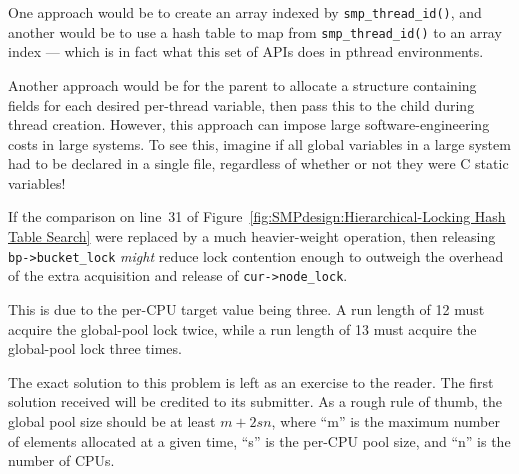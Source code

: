 
	One approach would be to create an array indexed by
	{\tt smp\_thread\_id()}, and another would be to use a hash
	table to map from {\tt smp\_thread\_id()} to an array
	index --- which is in fact what this
	set of APIs does in pthread environments.

	Another approach would be for the parent to allocate a structure
	containing fields for each desired per-thread variable, then
	pass this to the child during thread creation.
	However, this approach can impose large software-engineering
	costs in large systems.
	To see this, imagine if all global variables in a large system
	had to be declared in a single file, regardless of whether or
	not they were C static variables!


	If the comparison on line~31 of
	Figure~\ref{fig:SMPdesign:Hierarchical-Locking Hash Table Search}
	were replaced by a much heavier-weight operation,
	then releasing {\tt bp->bucket\_lock} \emph{might} reduce lock
	contention enough to outweigh the overhead of the extra
	acquisition and release of {\tt cur->node\_lock}.


	This is due to the per-CPU target value being three.
	A run length of 12 must acquire the global-pool lock twice,
	while a run length of 13 must acquire the global-pool lock
	three times.


	The exact solution to this problem is left as an exercise to
	the reader.
	The first solution received will be credited to its submitter.
	As a rough rule of thumb, the global pool size should be at least
	$m+2sn$, where
	``m'' is the maximum number of elements allocated at a given time,
	``s'' is the per-CPU pool size,
	and ``n'' is the number of CPUs.

